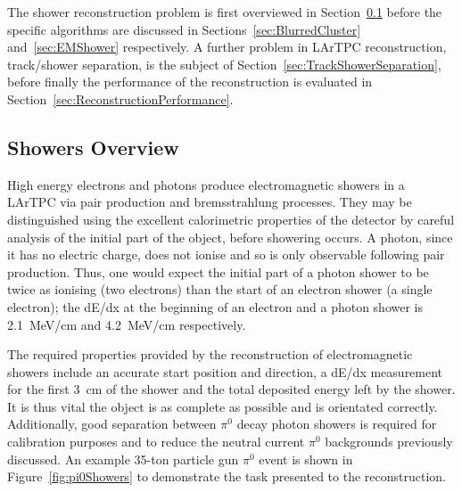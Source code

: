 The shower reconstruction problem is first overviewed in Section~\ref{sec:ShowersOverview} before the specific algorithms are discussed in Sections~\ref{sec:BlurredCluster} and~\ref{sec:EMShower} respectively.  A further problem in LArTPC reconstruction, track/shower separation, is the subject of Section~\ref{sec:TrackShowerSeparation}, before finally the performance of the reconstruction is evaluated in Section~\ref{sec:ReconstructionPerformance}.

\subsection{Showers Overview}\label{sec:ShowersOverview}

High energy electrons and photons produce electromagnetic showers in a LArTPC via pair production and bremsstrahlung processes.  They may be distinguished using the excellent calorimetric properties of the detector by careful analysis of the initial part of the object, before showering occurs.  A photon, since it has no electric charge, does not ionise and so is only observable following pair production.  Thus, one would expect the initial part of a photon shower to be twice as ionising (two electrons) than the start of an electron shower (a single electron); the dE/dx at the beginning of an electron and a photon shower is 2.1~MeV/cm and 4.2~MeV/cm respectively.

The required properties provided by the reconstruction of electromagnetic showers include an accurate start position and direction, a dE/dx measurement for the first 3~cm of the shower and the total deposited energy left by the shower.  It is thus vital the object is as complete as possible and is orientated correctly.  Additionally, good separation between $\pi^0$ decay photon showers is required for calibration purposes and to reduce the neutral current $\pi^0$ backgrounds previously discussed.  An example 35-ton particle gun $\pi^0$ event is shown in Figure~\ref{fig:pi0Showers} to demonstrate the task presented to the reconstruction.

